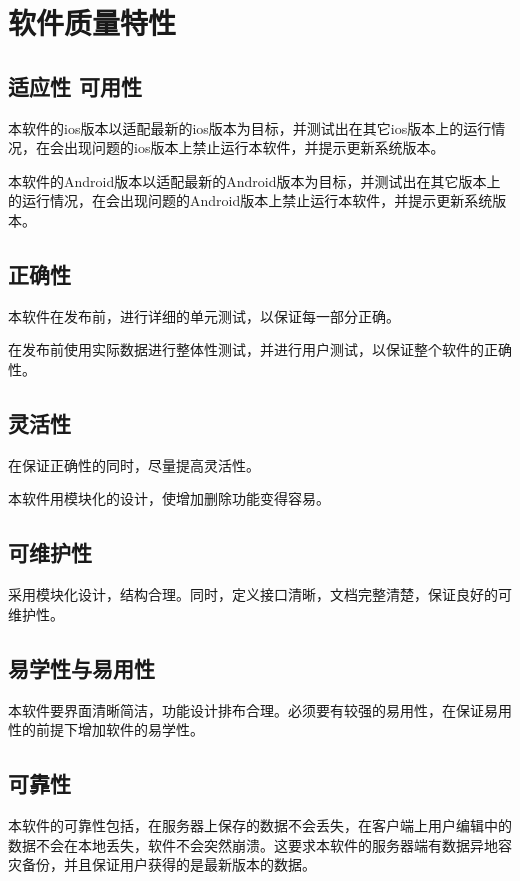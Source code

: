 \chapter{软件质量特性}
	\section{适应性 可用性}
	\item 本软件的ios版本以适配最新的ios版本为目标，并测试出在其它ios版本上的运行情况，在会出现问题的ios版本上禁止运行本软件，并提示更新系统版本。

	\item 本软件的Android版本以适配最新的Android版本为目标，并测试出在其它版本上的运行情况，在会出现问题的Android版本上禁止运行本软件，并提示更新系统版本。


	\section{正确性}
	本软件在发布前，进行详细的单元测试，以保证每一部分正确。

	在发布前使用实际数据进行整体性测试，并进行用户测试，以保证整个软件的正确性。

	\section{灵活性}
	在保证正确性的同时，尽量提高灵活性。

	本软件用模块化的设计，使增加删除功能变得容易。

	\section{可维护性}
	采用模块化设计，结构合理。同时，定义接口清晰，文档完整清楚，保证良好的可维护性。

	\section{易学性与易用性}
	本软件要界面清晰简洁，功能设计排布合理。必须要有较强的易用性，在保证易用性的前提下增加软件的易学性。

	\section{可靠性}
	本软件的可靠性包括，在服务器上保存的数据不会丢失，在客户端上用户编辑中的数据不会在本地丢失，软件不会突然崩溃。这要求本软件的服务器端有数据异地容灾备份，并且保证用户获得的是最新版本的数据。
